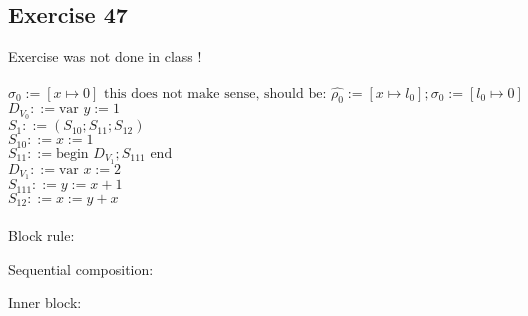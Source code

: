 \documentclass[12pt,fleqn]{article}		%
\begin{document}
\subsection{Exercise 47}
Exercise was not done in class !
\\\\
$ \sigma_0 := [x \mapsto 0] \text{ this does not make sense, should be: } \hat{\rho_0} := [x \mapsto l_0]; \sigma_0 := [l_0 \mapsto 0]$\\
$ D_{V_0} ::= \text{var } y := 1 $\\
$ S_1 ::= (S_{10}; S_{11}; S_{12}) $\\
$ S_{10} ::= x := 1 $\\
$ S_{11} ::= \text{begin } D_{V_1}; S_{111} \text{ end} $\\
$ D_{V_1} ::= \text{var } x := 2 $\\
$ S_{111} ::= y := x+1$\\
$ S_{12} ::= x := y + x$\\
\\
Block rule:
\begin{prooftree}
\end{prooftree}
Sequential composition:
\begin{prooftree}
\end{prooftree}
Inner block:
\begin{prooftree}
\end{prooftree}
\end{document}
